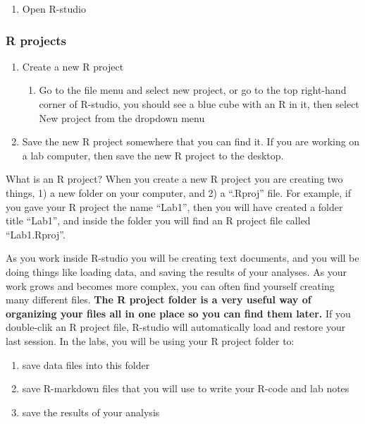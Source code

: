 \documentclass[
]{book}
\providecommand{\tightlist}{%
  \setlength{\itemsep}{0pt}\setlength{\parskip}{0pt}}
\begin{document}
\begin{enumerate}
\def\labelenumi{\arabic{enumi}.}
\tightlist
\item
  Open R-studio
\end{enumerate}

\hypertarget{r-projects}{%
\subsubsection{R projects}\label{r-projects}}

\begin{enumerate}
\def\labelenumi{\arabic{enumi}.}
\setcounter{enumi}{1}
\tightlist
\item
  Create a new R project

  \begin{enumerate}
  \def\labelenumii{\alph{enumii}.}
  \tightlist
  \item
    Go to the file menu and select new project, or go to the top right-hand corner of R-studio, you should see a blue cube with an R in it, then select New project from the dropdown menu
  \end{enumerate}
\item
  Save the new R project somewhere that you can find it. If you are working on a lab computer, then save the new R project to the desktop.
\end{enumerate}

What is an R project? When you create a new R project you are creating two things, 1) a new folder on your computer, and 2) a ``.Rproj'' file. For example, if you gave your R project the name ``Lab1'', then you will have created a folder title ``Lab1'', and inside the folder you will find an R project file called ``Lab1.Rproj''.

As you work inside R-studio you will be creating text documents, and you will be doing things like loading data, and saving the results of your analyses. As your work grows and becomes more complex, you can often find yourself creating many different files. \textbf{The R project folder is a very useful way of organizing your files all in one place so you can find them later.} If you double-clik an R project file, R-studio will automatically load and restore your last session. In the labs, you will be using your R project folder to:

\begin{enumerate}
\def\labelenumi{\arabic{enumi}.}
\tightlist
\item
  save data files into this folder
\item
  save R-markdown files that you will use to write your R-code and lab notes
\item
  save the results of your analysis
\end{enumerate}
\end{document}
